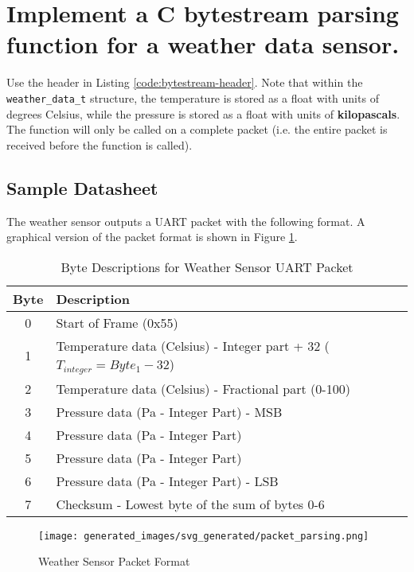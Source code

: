 \documentclass[main.tex]{subfiles}
\begin{document}
\section{Implement a C bytestream parsing function for a weather data sensor.} \label{section:packet_parsing}
Use the header in Listing \ref{code:bytestream-header}. Note that within the \texttt{weather\_data\_t} structure, the temperature is stored as a float with units of degrees Celsius, while the pressure is stored as a float with units of \textbf{kilopascals}. The function will only be called on a complete packet (i.e. the entire packet is received before the function is called).



\subsection{Sample Datasheet}
The weather sensor outputs a UART packet with the following format. A graphical version of the packet format is shown in Figure \ref{fig:packet-data}.
\begin{table}[H]
    \centering
    \begin{tabular}{|c|l|}
    \hline
    \textbf{Byte} & \textbf{Description} \\ \hline
    0 & Start of Frame (0x55) \\ \hline
    1 & Temperature data (Celsius) - Integer part + 32 ($T_{integer} = Byte_{1} - 32$)  \\ \hline
    2 & Temperature data (Celsius) - Fractional part (0-100) \\ \hline
    3 & Pressure data (Pa - Integer Part) - MSB \\ \hline
    4 & Pressure data (Pa - Integer Part) \\ \hline
    5 & Pressure data (Pa - Integer Part) \\ \hline
    6 & Pressure data (Pa - Integer Part) - LSB \\ \hline
    7 & Checksum - Lowest byte of the sum of bytes 0-6 \\ \hline
    \end{tabular}
    \caption{Byte Descriptions for Weather Sensor UART Packet}
    \label{table:byte_description}
\end{table}
    

\begin{figure}[H]
    \centering
    \texttt{[image: generated\_images/svg\_generated/packet\_parsing.png]}
    \caption{Weather Sensor Packet Format}
    \label{fig:packet-data}
\end{figure}
\end{document}
